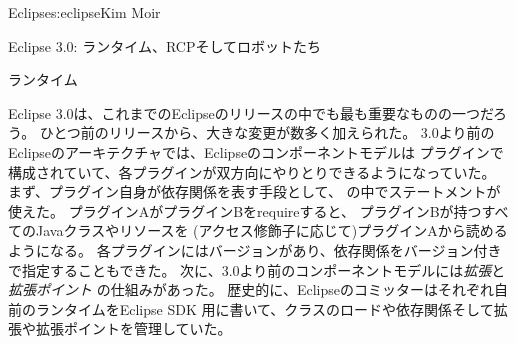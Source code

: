 \begin{aosachapter}{Eclipse}{s:eclipse}{Kim Moir}
\begin{aosasect1}{Eclipse 3.0: ランタイム、RCPそしてロボットたち}

\begin{aosasect2}{ランタイム}

Eclipse 3.0は、これまでのEclipseのリリースの中でも最も重要なものの一つだろう。
ひとつ前のリリースから、大きな変更が数多く加えられた。
3.0より前のEclipseのアーキテクチャでは、Eclipseのコンポーネントモデルは
プラグインで構成されていて、各プラグインが双方向にやりとりできるようになっていた。
まず、プラグイン自身が依存関係を表す手段として、
の中でステートメントが使えた。
プラグインAがプラグインBをrequireすると、
プラグインBが持つすべてのJavaクラスやリソースを
(アクセス修飾子に応じて)プラグインAから読めるようになる。
各プラグインにはバージョンがあり、依存関係をバージョン付きで指定することもできた。
次に、3.0より前のコンポーネントモデルには\emph{拡張}と\emph{拡張ポイント}
の仕組みがあった。
歴史的に、Eclipseのコミッターはそれぞれ自前のランタイムをEclipse SDK
用に書いて、クラスのロードや依存関係そして拡張や拡張ポイントを管理していた。


\end{aosasect2}
\end{aosasect1}
\end{aosachapter}
